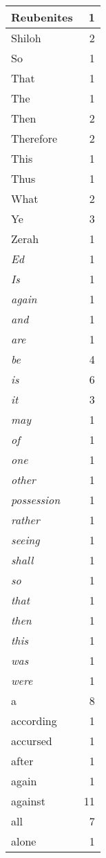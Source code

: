 \begin{center}
\begin{longtable}{l|r}
Reubenites & 1\\ \hline 
Shiloh & 2\\ \hline 
So & 1\\ \hline 
That & 1\\ \hline 
The & 1\\ \hline 
Then & 2\\ \hline 
Therefore & 2\\ \hline 
This & 1\\ \hline 
Thus & 1\\ \hline 
What & 2\\ \hline 
Ye & 3\\ \hline 
Zerah & 1\\ \hline 
\emph{Ed} & 1\\ \hline 
\emph{Is} & 1\\ \hline 
\emph{again} & 1\\ \hline 
\emph{and} & 1\\ \hline 
\emph{are} & 1\\ \hline 
\emph{be} & 4\\ \hline 
\emph{is} & 6\\ \hline 
\emph{it} & 3\\ \hline 
\emph{may} & 1\\ \hline 
\emph{of} & 1\\ \hline 
\emph{one} & 1\\ \hline 
\emph{other} & 1\\ \hline 
\emph{possession} & 1\\ \hline 
\emph{rather} & 1\\ \hline 
\emph{seeing} & 1\\ \hline 
\emph{shall} & 1\\ \hline 
\emph{so} & 1\\ \hline 
\emph{that} & 1\\ \hline 
\emph{then} & 1\\ \hline 
\emph{this} & 1\\ \hline 
\emph{was} & 1\\ \hline 
\emph{were} & 1\\ \hline 
a & 8\\ \hline 
according & 1\\ \hline 
accursed & 1\\ \hline 
after & 1\\ \hline 
again & 1\\ \hline 
against & 11\\ \hline 
all & 7\\ \hline 
alone & 1\\ \hline 

\end{longtable}
\end{center}
